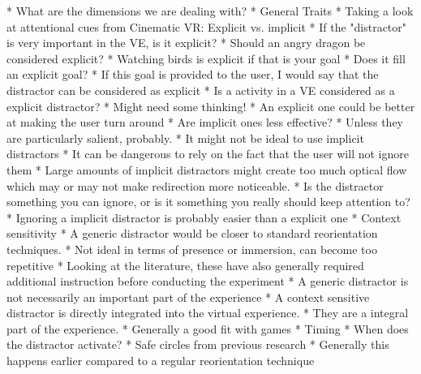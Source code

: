 * What are the dimensions we are dealing with?
   * General Traits
       * Taking a look at attentional cues from Cinematic VR: Explicit vs. implicit
           * If the "distractor" is very important in the VE, is it explicit?
              * Should an angry dragon be considered explicit?
              * Watching birds is explicit if that is your goal
              * Does it fill an explicit goal?
                 * If this goal is provided to the user, I would say that the distractor can be considered as explicit
           * Is a activity in a VE considered as a explicit distractor?
               * Might need some thinking!
           * An explicit one could be better at making the user turn around
           * Are implicit ones less effective?
               * Unless they are particularly salient, probably.
               * It might not be ideal to use implicit distractors
               * It can be dangerous to rely on the fact that the user will not ignore them
               * Large amounts of implicit distractors might create too much optical flow which may or may not make redirection more noticeable. 
           * Is the distractor something you can ignore, or is it something you really should keep attention to?
               * Ignoring a implicit distractor is probably easier than a explicit one
       * Context sensitivity
          * A generic distractor would be closer to standard reorientation techniques.
             * Not ideal in terms of presence or immersion, can become too repetitive
             * Looking at the literature, these have also generally required additional instruction before conducting the experiment
             * A generic distractor is not necessarily an important part of the experience
          * A context sensitive distractor is directly integrated into the virtual experience. 
             * They are a integral part of the experience.
             * Generally a good fit with games
       * Timing
            * When does the distractor activate?
            * Safe circles from previous research
            * Generally this happens earlier compared to a regular reorientation technique
   

